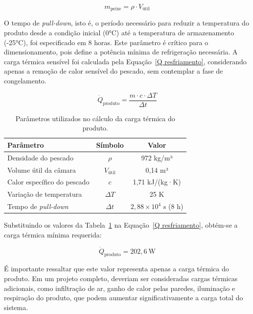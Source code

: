 \begin{equation}
    m_{\text{peixe}} = \rho \cdot V_{\text{útil}}
    \label{massa peixe}
\end{equation}

O tempo de \textit{pull-down}, isto é, o período necessário para reduzir a temperatura do produto desde a condição inicial (0°C) até a temperatura de armazenamento (-25°C), foi especificado em 8 horas. Este parâmetro é crítico para o dimensionamento, pois define a potência mínima de refrigeração necessária. A carga térmica sensível foi calculada pela Equação~\ref{Q resfriamento}, considerando apenas a remoção de calor sensível do pescado, sem contemplar a fase de congelamento.

\begin{equation}
    \dot{Q}_{\text{produto}} = \frac{m \cdot c \cdot \Delta T}{\Delta t}
    \label{Q resfriamento}
\end{equation}

\begin{table}[ht]
\centering
\begin{tabular}{|l|c|c|}
\hline
\textbf{Parâmetro} & \textbf{Símbolo} & \textbf{Valor} \\ \hline
Densidade do pescado & $\rho$ & 972 kg/m³ \\ \hline
Volume útil da câmara & $V_{\text{útil}}$ & 0,14 m³ \\ \hline
Calor específico do pescado & $c$ & 1,71 kJ/(kg·K) \\ \hline
Variação de temperatura & $\Delta T$ & 25 K \\ \hline
Tempo de \textit{pull-down} & $\Delta t$ & $2,88 \times 10^{4}$ s (8 h) \\ \hline
\end{tabular}
\caption{Parâmetros utilizados no cálculo da carga térmica do produto.}
\label{tab:tabela dados}
\end{table}

Substituindo os valores da Tabela~\ref{tab:tabela dados} na Equação~\ref{Q resfriamento}, obtém-se a carga térmica mínima requerida:

\begin{equation}
    \dot{Q}_{\text{produto}} = 202,6~\text{W}
    \label{carga}
\end{equation}

É importante ressaltar que este valor representa apenas a carga térmica do produto. Em um projeto completo, deveriam ser consideradas cargas térmicas adicionais, como infiltração de ar, ganho de calor pelas paredes, iluminação e respiração do produto, que podem aumentar significativamente a carga total do sistema.

